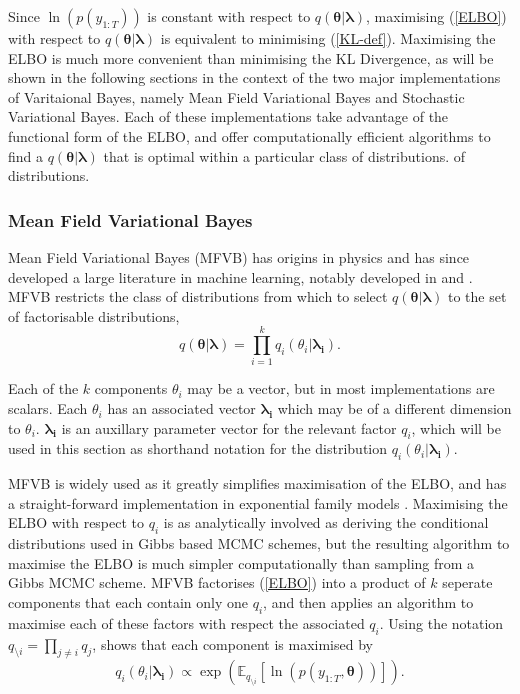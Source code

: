 \documentclass[12pt,a4paper]{article}%
\numberwithin{equation}{section}
\begin{document}
Since $\ln(p(y_{1:T}))$ is constant with respect to $q(\boldsymbol{\theta} | \boldsymbol{\lambda})$, maximising (\ref{ELBO}) with respect to $q(\boldsymbol{\theta} | \boldsymbol{\lambda})$ is equivalent to minimising (\ref{KL-def}). Maximising the ELBO is much more convenient than minimising the KL Divergence, as will be shown in the following sections in the context of the two major implementations of Varitaional Bayes, namely Mean Field Variational Bayes and Stochastic Variational Bayes. Each of these implementations take advantage of the functional form of the ELBO, and offer computationally efficient algorithms to find a $q(\boldsymbol{\theta} | \boldsymbol{\lambda})$ that is optimal within a particular class of distributions. 
of distributions. 

\subsubsection{Mean Field Variational Bayes} \label{sec:mfvb}

Mean Field Variational Bayes (MFVB) has origins in physics \citep{Chandler1987} and has since developed a large literature in machine learning, notably developed in \citet{Jordan1999} and \citet{Beal2003}. MFVB restricts the class of distributions from which to select $q(\boldsymbol{\theta} | \boldsymbol{\lambda})$ to the set of factorisable distributions,
\begin{equation}
\label{mf1}
q(\boldsymbol{\theta} | \boldsymbol{\lambda}) = \prod_{i=1}^k q_i(\theta_i | \boldsymbol{\lambda_i}).
\end{equation}

Each of the $k$ components $\theta_i$ may be a vector, but in most implementations are scalars. Each $\theta_i$ has an associated vector $\boldsymbol{\lambda_i}$ which may be of a different dimension to $\theta_i$. $\boldsymbol{\lambda_i}$ is an auxillary parameter vector for the relevant factor $q_i$, which will be used in this section as shorthand notation for the distribution $q_i(\theta_i |\boldsymbol{\lambda_i})$. 

MFVB is widely used as it greatly simplifies maximisation of the ELBO, and has a straight-forward implementation in exponential family models \citep{Wainwright2008}.  Maximising the ELBO with respect to $q_i$ is as analytically involved as deriving the conditional distributions used in Gibbs based MCMC schemes, but the resulting algorithm to maximise the ELBO is much simpler computationally than sampling from a Gibbs MCMC scheme. MFVB factorises (\ref{ELBO}) into a product of $k$ seperate components that each contain only one $q_i$, and then applies an algorithm to maximise each of these factors with respect the associated $q_i$. Using the notation $q_{\setminus i} = \prod_{j\neq i}q_j$, \citet{Attias1999} shows that each component is maximised by
\begin{equation}
\label{mf2}
q_i(\theta_i |\boldsymbol{\lambda_i}) \propto\exp( \mathbb{E}_{q_{\setminus i}} [\ln(p(y_{1:T},\boldsymbol{\theta}))]).
\end{equation}
\end{document}
